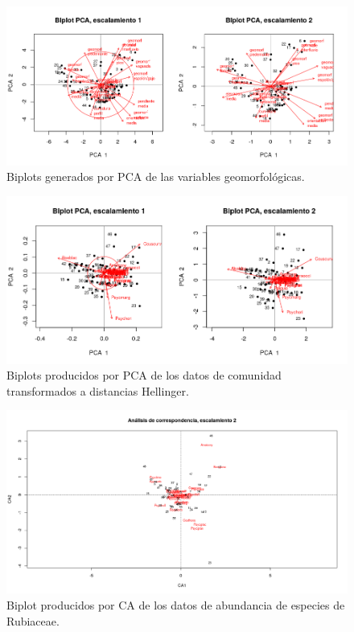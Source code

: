 \documentclass[11pt,]{article}
\begin{document}
\begin{figure}
\centering
\includegraphics{pca_biplot_geomorf.png}
\caption{Biplots generados por PCA de las variables geomorfológicas.
\label{fig:pca_biplot_geomorf}}
\end{figure}

\begin{figure}
\centering
\includegraphics{pca_biplot_sps.png}
\caption{Biplots producidos por PCA de los datos de comunidad
transformados a distancias Hellinger. \label{fig:pca_biplot_sps}}
\end{figure}

\begin{figure}
\centering
\includegraphics{biplot_correspndncia_sps_escal_2.png}
\caption{Biplot producidos por CA de los datos de abundancia de especies
de Rubiaceae. \label{fig:biplot_correspndncia_sps_escal_2}}
\end{figure}
\end{document}
